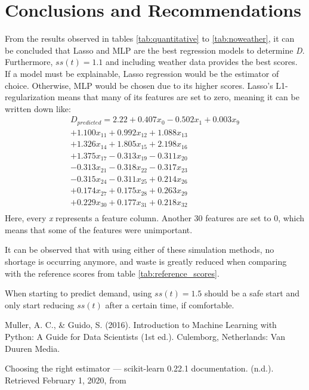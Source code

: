 \documentclass[final,authoryear,5p,times,twocolumn, 11pt]{elsarticle}
\begin{document}
\section{Conclusions and Recommendations}
\label{sec:conclusion}
From the results observed in tables \ref{tab:quantitative} to \ref{tab:noweather}, it can be concluded that Lasso and MLP are the best regression models to determine \textit{D}. Furthermore, $ss(t)=1.1$ and including weather data provides the best scores. If a model must be explainable, Lasso regression would be the estimator of choice. Otherwise, MLP would be chosen due to its higher scores. Lasso's L1-regularization means that many of its features are set to zero, meaning it can be written down like:
\begin{equation}
\begin{split}
D_{predicted} = 2.22 + 0.407x_{0} - 0.502x_{1} + 0.003x_{9}\\ 
					 + 1.100x_{11} + 0.992x_{12} + 1.088x_{13}\\
					 + 1.326x_{14} + 1.805x_{15} + 2.198x_{16}\\
					 + 1.375x_{17} - 0.313x_{19} - 0.311x_{20}\\
					 - 0.313x_{21} - 0.318x_{22} - 0.317x_{23}\\
					 - 0.315x_{24} - 0.311x_{25} + 0.214x_{26}\\
					 + 0.174x_{27} + 0.175x_{28} + 0.263x_{29}\\
					 + 0.229x_{30} + 0.177x_{31} + 0.218x_{32}\\
\end{split}
\end{equation}
Here, every \textit{x} represents a feature column. Another 30 features are set to 0, which means that some of the features were unimportant.

It can be observed that with using either of these simulation methods, no shortage is occurring anymore, and waste is greatly reduced when comparing with the reference scores from table \ref{tab:reference_scores}.

When starting to predict demand, using $ss(t)=1.5$ should be a safe start and only start reducing $ss(t)$ after a certain time, if comfortable. 

\begin{thebibliography}{2}

Muller, A. C., \& Guido, S. (2016). Introduction to Machine Learning with Python: A Guide for Data Scientists (1st ed.). Culemborg, Netherlands: Van Duuren Media.

Choosing the right estimator — scikit-learn 0.22.1 documentation. (n.d.). Retrieved February 1, 2020, from 
\end{thebibliography}
\end{document}
